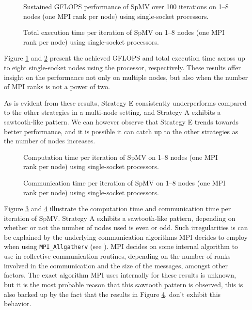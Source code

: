 \begin{figure}[H]
    \centering
    \caption{Sustained GFLOPS performance of SpMV over 100 iterations on 1–8 nodes (one MPI rank per node) using single-socket \romeq{} processors.}
    \label{fig:gflopsromemulti}
\end{figure}

\begin{figure}[H]
    \centering
    \caption{Total execution time per iteration of SpMV on 1–8 nodes (one MPI rank per node) using single-socket \romeq{} processors.}
    \label{fig:tromemulti}
\end{figure}

Figure \ref{fig:gflopsromemulti} and \ref{fig:tromemulti} present the achieved GFLOPS and total execution time across up to eight single-socket nodes using the \romeq{} processor, respectively. These results offer insight on the performance not only on multiple nodes, but also when the number of MPI ranks is not a power of two.
\medskip

As is evident from these results, Strategy E consistently underperforms compared to the other strategies in a multi-node setting, and Strategy A exhibits a sawtooth-like pattern. We can however observe that Strategy E trends towards better performance, and it is possible it can catch up to the other strategies as the number of nodes increases.

\begin{figure}[H]
    \centering
    \caption{Computation time per iteration of SpMV on 1–8 nodes (one MPI rank per node) using single-socket \romeq{} processors.}
    \label{fig:tcompromemulti}
\end{figure}

\begin{figure}[H]
    \centering
    \caption{Communication time per iteration of SpMV on 1–8 nodes (one MPI rank per node) using single-socket \romeq{} processors.}
    \label{fig:tcommromemulti}
\end{figure}

Figure \ref{fig:tcompromemulti} and \ref{fig:tcommromemulti} illustrate the computation time and communication time per iteration of SpMV. Strategy A exhibits a sawtooth-like pattern, depending on whether or not the number of nodes used is even or odd. Such irregularities is can be explained by the underlying communication algorithms MPI decides to employ when using \texttt{MPI\_Allgatherv} (see \cite{10064025}). MPI decides on some internal algorithm to use in collective communication routines, depending on the number of ranks involved in the communication and the size of the messages, amongst other factors. The exact algorithm MPI uses internally for these results is unknown, but it is the most probable reason that this sawtooth pattern is observed, this is also backed up by the fact that the results in Figure \ref{fig:tcommromemulti}, don't exhibit this behavior.  

